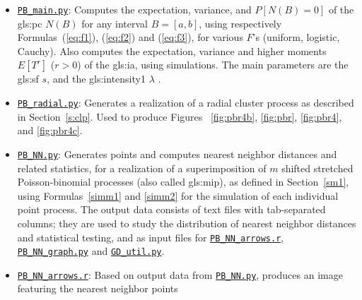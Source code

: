 \documentclass[10pt]{article}
\begin{document}
\begin{itemize}
\item \href{https://github.com/VincentGranville/Point-Processes/blob/main/Source\%20Code/PB_main.py}{\texttt{PB\_main.py}}: Computes the expectation, variance, and $P[N(B)=0]$ of  the \gls{gls:pc} $N(B)$ for any interval $B=[a,b]$,
using respectively Formulas~(\ref{eq:f1}), (\ref{eq:f2}) and (\ref{eq:f3}), for various $F$'s (uniform, logistic, Cauchy). Also computes the expectation, variance and higher moments $E[T^r]$ ($r>0$) of the \gls{gls:ia}, using simulations.
The main parameters are the \gls{gls:sf} $s$, and the \gls{gls:intensity1} $\lambda$ .
\item \href{https://github.com/VincentGranville/Point-Processes/blob/main/Source\%20Code/PB_radial.py}{\texttt{PB\_radial.py}}: Generates a realization of a radial cluster process as described in Section~\ref{s:clp}. Used to produce
Figures~ \ref{fig:pbr4b}, \ref{fig:pbr}, \ref{fig:pbr4}, and \ref{fig:pbr4c}.
\item \href{https://github.com/VincentGranville/Point-Processes/blob/main/Source\%20Code/PB_NN.py}{\texttt{PB\_NN.py}}: Generates points and computes \textcolor{index}{nearest neighbor distances} and related statistics, for a realization of a superimposition
of $m$ shifted stretched Poisson-binomial processes (also called \gls{gls:mip}), as defined in Section~\ref{sm1}, using Formulas~\ref{simm1} and
\ref{simm2} for the simulation of each individual point process. The output data consists of text files with tab-separated columns; they are used to study the distribution of nearest neighbor distances and statistical testing,
and as input files for 
    \href{https://github.com/VincentGranville/Point-Processes/blob/main/Source\%20Code/PP_NN_arrows.r}{\texttt{PB\_NN\_arrows.r}}, 
    \href{https://github.com/VincentGranville/Point-Processes/blob/main/Source\%20Code/PB_NN_graph.py}{\texttt{PB\_NN\_graph.py}} and 
    \href{https://github.com/VincentGranville/Point-Processes/blob/main/Source\%20Code/GD_util.py}{\texttt{GD\_util.py}}. 
\item \href{https://github.com/VincentGranville/Point-Processes/blob/main/Source\%20Code/PP_NN_arrows.r}{\texttt{PB\_NN\_arrows.r}}: Based on output data from 
       \href{https://github.com/VincentGranville/Point-Processes/blob/main/Source\%20Code/PB_NN.py}{\texttt{PB\_NN.py}}, produces an image featuring the nearest neighbor points

\end{itemize}
\end{document}
